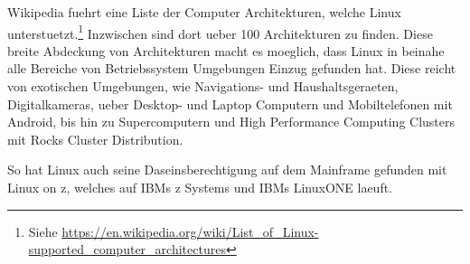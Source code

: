 Wikipedia fuehrt eine Liste der Computer Architekturen, welche Linux unterstuetzt.\footnote{Siehe \url{https://en.wikipedia.org/wiki/List_of_Linux-supported_computer_architectures}}
Inzwischen sind dort ueber 100 Architekturen zu finden. Diese breite Abdeckung von Architekturen macht es moeglich, dass Linux in beinahe alle Bereiche von Betriebssystem Umgebungen Einzug gefunden hat. Diese reicht von exotischen Umgebungen, wie Navigations- und Haushaltsgeraeten, Digitalkameras, ueber Desktop- und Laptop Computern und Mobiltelefonen mit Android, bis hin zu Supercomputern und High Performance Computing Clusters mit Rocks Cluster Distribution.

So hat Linux auch seine Daseinsberechtigung auf dem Mainframe gefunden mit Linux on z, welches auf IBMs z Systems und IBMs LinuxONE laeuft.
